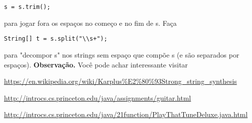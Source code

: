 \documentclass{article}
\begin{document}
\begin{lstlisting}[breaklines, gobble=8]
	s = s.trim();
\end{lstlisting}

para jogar fora os espa\c{c}os no come\c{c}o e no fim de s. Fa\c{c}a

\begin{lstlisting}[breaklines, gobble=8]
	String[] t = s.split("\\s+");
\end{lstlisting}

para "decompor s" nos strings sem espa\c{c}o que comp\~oe s (e s\~ao separados por espa\c{c}os).
\bigbreak
\textbf{Observa\c{c}\~ao.} Voc\^e pode achar interessante visitar

\url{https://en.wikipedia.org/wiki/Karplus%E2%80%93Strong_string_synthesis}

\url{http://introcs.cs.princeton.edu/java/assignments/guitar.html}

\url{http://introcs.cs.princeton.edu/java/21function/PlayThatTuneDeluxe.java.html}
\end{document}
